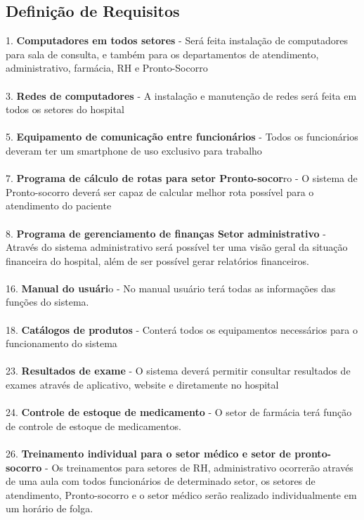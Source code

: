   \subsection{Definição de Requisitos}
1. \textbf{Computadores em todos setores} - Será feita instalação de computadores para sala de consulta, e também para os departamentos de atendimento, administrativo, farmácia, RH e Pronto-Socorro \\\\
3. \textbf{Redes de computadores} - A instalação e manutenção de redes será feita em todos os setores do hospital\\\\
5. \textbf{Equipamento de comunicação entre funcionários} - Todos os funcionários deveram ter um smartphone de uso exclusivo para trabalho\\\\
7. \textbf{Programa de cálculo de rotas para setor Pronto-socor}ro - O sistema de Pronto-socorro deverá ser capaz de calcular melhor rota possível para o atendimento do paciente\\\\
8. \textbf{Programa de gerenciamento de finanças Setor administrativo} - Através do sistema administrativo será possível ter uma visão geral da situação financeira do hospital, além de ser possível gerar relatórios financeiros.\\\\
16. \textbf{Manual do usuári}o - No manual usuário terá todas as informações das funções do sistema.\\\\
18.\textbf{ Catálogos de produtos} - Conterá todos os equipamentos necessários para o funcionamento do sistema\\\\
23.\textbf{ Resultados de exame }- O sistema deverá permitir consultar resultados de exames através de aplicativo, website e diretamente no hospital\\\\
24. \textbf{Controle de estoque de medicamento} - O setor de farmácia terá função de controle de estoque de medicamentos.\\\\
26. \textbf{Treinamento individual para o setor médico e setor de pronto-socorro} - Os treinamentos para setores de RH, administrativo ocorrerão através de uma aula com todos funcionários de determinado setor, os setores de atendimento, Pronto-socorro e o setor médico serão realizado individualmente em um horário de folga.\\\\
